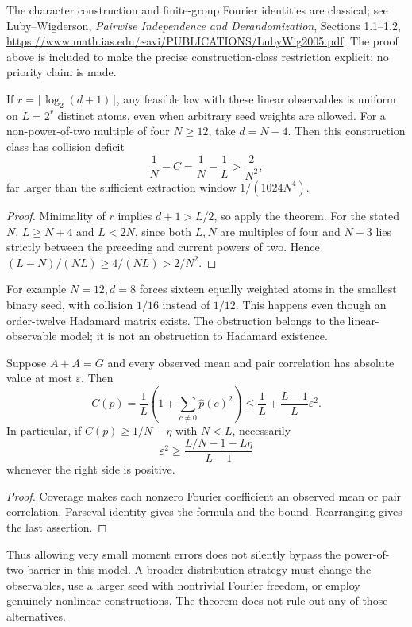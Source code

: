 The character construction and finite-group Fourier identities are
classical; see Luby--Wigderson, \emph{Pairwise Independence and
Derandomization}, Sections 1.1--1.2,
\url{https://www.math.ias.edu/~avi/PUBLICATIONS/LubyWig2005.pdf}.
The proof above is included to make the precise construction-class
restriction explicit; no priority claim is made.

\begin{corollary}
\label{cor:minimum-seed}
If $r=\lceil\log_2(d+1)\rceil$, any feasible law with these linear
observables is uniform on $L=2^r$ distinct atoms, even when arbitrary
seed weights are allowed.
For a non-power-of-two multiple of four $N\ge12$, take $d=N-4$.
Then this construction class has collision deficit
\[
 \frac1N-C=\frac1N-\frac1L>\frac2{N^2},
\]
far larger than the sufficient extraction window $1/(1024N^4)$.
\end{corollary}
\begin{proof}
Minimality of $r$ implies $d+1>L/2$, so apply the theorem.
For the stated $N$, $L\ge N+4$ and $L<2N$, since both $L,N$ are
multiples of four and $N-3$ lies strictly between the preceding and
current powers of two. Hence
$(L-N)/(NL)\ge4/(NL)>2/N^2$.
\end{proof}
For example $N=12,d=8$ forces sixteen equally weighted atoms in the
smallest binary seed, with collision $1/16$ instead of $1/12$.
This happens even though an order-twelve Hadamard matrix exists.
The obstruction belongs to the linear-observable model; it is not
an obstruction to Hadamard existence.

\begin{proposition}\label{prop:approx-character}
Suppose $A+A=G$ and every observed mean and pair correlation has
absolute value at most $\varepsilon$. Then
\[
 C(p)=\frac1L\left(1+\sum_{c\ne0}\widehat p(c)^2\right)
 \le\frac1L+\frac{L-1}{L}\varepsilon^2.
\]
In particular, if $C(p)\ge1/N-\eta$ with $N<L$, necessarily
\[
 \varepsilon^2\ge
 \frac{L/N-1-L\eta}{L-1}
\]
whenever the right side is positive.
\end{proposition}
\begin{proof}
Coverage makes each nonzero Fourier coefficient an observed mean or
pair correlation. Parseval identity gives the formula and the bound.
Rearranging gives the last assertion.
\end{proof}
Thus allowing very small moment errors does not silently bypass the
power-of-two barrier in this model. A broader distribution strategy
must change the observables, use a larger seed with nontrivial Fourier
freedom, or employ genuinely nonlinear constructions. The theorem
does not rule out any of those alternatives.
